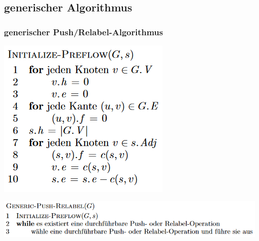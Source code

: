 \documentclass[draft]{beamer}
\newcommand{\pr}{Push/Relabel}
\begin{document}
\subsection{generischer Algorithmus}
\begin{frame}
\frametitle{generischer \pr -Algorithmus}
\centering
\begin{adjustbox}{width = 0.5\textwidth}
\includegraphics{../Grafiken/Init-Preflow.png}
\end{adjustbox}
\begin{adjustbox}{width = \textwidth}
\includegraphics{../Grafiken/Generic-PR.png}
\end{adjustbox}
\end{frame}
\end{document}
